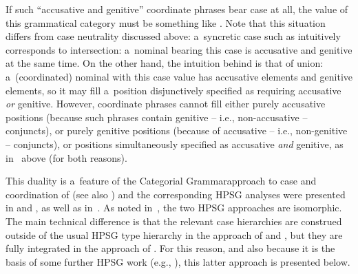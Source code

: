 \documentclass[output=paper,biblatex,babelshorthands,newtxmath,draftmode,colorlinks,citecolor=brown]{langscibook}
\begin{document}
\begin{exe}
\begin{xlist}
\begin{exe}
\begin{xlist}
If such “accusative and genitive” coordinate phrases bear case at all, the value of this grammatical category must be something like .  Note that this situation differs from case neutrality discussed above: a~syncretic case such as  intuitively corresponds to intersection: a~nominal bearing this case is accusative and genitive at the same time.  On the other hand, the intuition behind  is that of union: a~(coordinated) nominal with this case value has accusative elements and genitive elements, so it may fill a~position disjunctively specified as requiring accusative \emph{or} genitive.  However,  coordinate phrases cannot fill either purely accusative positions (because such phrases contain genitive – i.e., non-accusative – conjuncts), or purely genitive positions (because of accusative – i.e., non-genitive – conjuncts), or positions simultaneously specified as accusative \emph{and} genitive, as in~ above (for both reasons).

This duality is a~feature of the Categorial Grammar\indexcg approach to case and coordination of \citet{Bayer96} (see also \citealt{BJ95}) and the corresponding HPSG analyses were presented in \citet{levy:01} and \citet{lev:pol:01}, as well as in~\citet{dani:01}.  As noted in~\citet[233]{lev:pol:01}, the two HPSG approaches are isomorphic.  The main technical difference is that the relevant case hierarchies are construed outside of the usual HPSG type hierarchy in the approach of \citet{levy:01} and \citet{lev:pol:01}, but they are fully integrated in the approach of \citet{dani:01}.  For this reason, and also because it is the basis of some further HPSG work (e.g., \citealt{Crysmann2005c}), this latter approach is presented below.


\end{xlist}
\end{exe}
\end{xlist}
\end{exe}
\end{document}
